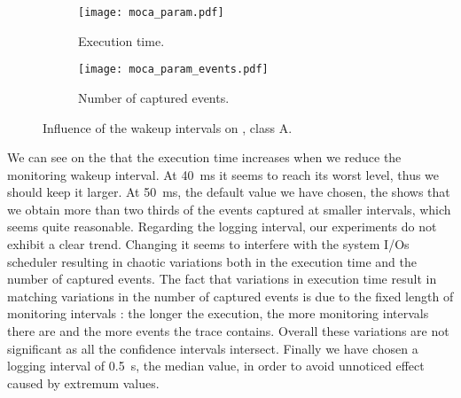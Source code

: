 \begin{figure}[htb]
    \centering
    \begin{subfigure}{.9\linewidth}
        \texttt{[image: moca\_param.pdf]}
        \caption{Execution time.}
        \label{fig:param_time}
    \end{subfigure}
    \begin{subfigure}{.9\linewidth}
        \texttt{[image: moca\_param\_events.pdf]}
        \caption{Number of captured events.}
        \label{fig:param_evts}
    \end{subfigure}
    \caption{Influence of the wakeup intervals on \IS, class A.}
    \label{fig:param}
\end{figure}

We can see on the  that the execution time increases when we
reduce the monitoring wakeup interval. At \SI{40}{ms}
it seems to reach its worst level, thus we should keep it larger. At \SI{50}{ms}, the default value we have chosen, the
 shows that we obtain more than two thirds of the events captured
at smaller intervals, which seems quite reasonable.
Regarding the logging interval, our experiments do not exhibit a clear trend. Changing it seems to interfere with the system I/Os scheduler resulting in chaotic
variations both in the execution time and the number of captured events. The fact that variations in execution time result in matching variations in the number
of captured events is due to the fixed length of monitoring intervals : the longer the execution, the more monitoring intervals there are and the more events
the trace contains. Overall these variations are not significant as all the confidence intervals intersect. 
Finally we have chosen a logging interval of \SI{0.5}{s}, the median value, in order to avoid unnoticed effect caused by extremum values.


